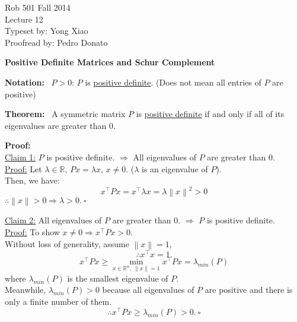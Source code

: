 \documentclass[letterpaper]{article}
\newcommand{\real}{\mathbb R}  %
\begin{document}
\baselineskip=48pt  %

\setlength{\parskip}{.3in}
\setlength{\itemsep}{.3in}

\pagestyle{plain}

{\Large \bf
\begin{center}
Rob 501 Fall 2014\\
Lecture 12\\
Typeset by:  Yong Xiao\\
Proofread by: Pedro Donato
\end{center}
}

\Large

\begin{center}\textbf{Positive Definite Matrices and Schur Complement}\end{center}

\noindent \textbf{Notation:}~ $P>0$: $P$ is \underline{positive definite}. (Does not mean all entries of $P$ are positive)

\noindent \textbf{Theorem:}~ A symmetric matrix $P$ is \underline{positive definite} if and only if all of its eigenvalues are greater than $0$.

\noindent \textbf{Proof:}\\
    \underline{Claim 1:} $P$ is positive definite. $\Rightarrow$ All eigenvalues of $P$ are greater than $0$.\\
    \underline{Proof:} Let $\lambda \in \real $, $Px = \lambda x$, $x \neq 0$. ($\lambda$ is an eigenvalue of $P$).\\
        Then, we have:
        $$x^\top P x = x^\top \lambda x = \lambda \left\| x \right\| ^2 >0$$
        $\therefore\left\|x\right\| > 0 \Rightarrow \lambda > 0.\ \square$

    \underline{Claim 2:}   All eigenvalues of $P$ are greater than $0$. $\Rightarrow$  $P$ is positive definite. \\
    \underline{Proof:} To show $x \neq 0 \Rightarrow x^\top P x >0$.\\
        Without loss of generality, assume $\left\| x \right\| = 1$,\\
	    $$\therefore x^\top x = 1.$$
	    $$x^\top P x \geq \displaystyle \min_{x \in \real^n,\ \|x\| = 1} x^\top P x = \lambda_{min} (P) $$
	where $\lambda_{min} (P)$ is the smallest eigenvalue of $P$.\\
    Meanwhile, $ \lambda_{min} (P) > 0$ because all eigenvalues of $P$ are positive and there is only a finite number of them.
	$$\therefore x^\top P x \geq \lambda_{min} (P) > 0.\ \square$$
	
\end{document}

